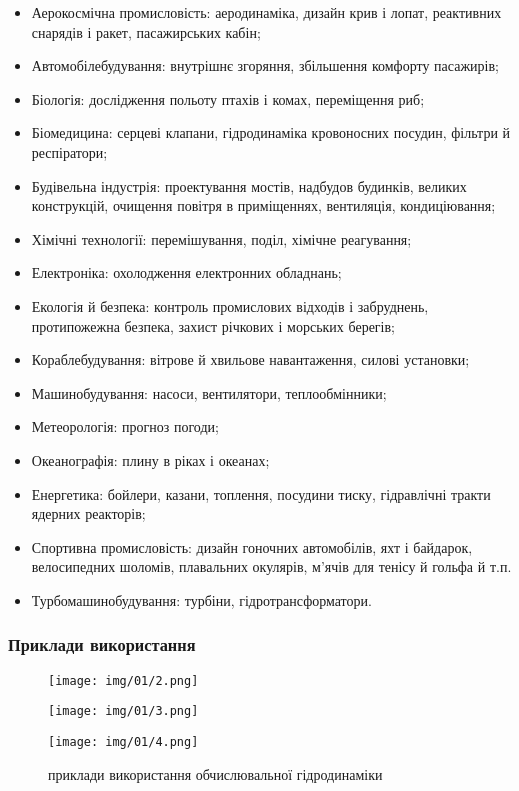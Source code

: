 \begin{itemize}
    \item Аерокосмічна промисловість: аеродинаміка, дизайн крив і лопат, реактивних снарядів і ракет, пасажирських кабін;
    \item Автомобілебудування: внутрішнє згоряння, збільшення комфорту пасажирів;
    \item Біологія: дослідження польоту птахів і комах, переміщення риб;
    \item Біомедицина: серцеві клапани, гідродинаміка кровоносних посудин, фільтри й респіратори;
    \item Будівельна індустрія: проектування мостів, надбудов будинків, великих конструкцій, очищення повітря в приміщеннях, вентиляція, кондиціювання;
    \item Хімічні технології: перемішування, поділ, хімічне реагування;
    \item Електроніка: охолодження електронних обладнань;
    \item Екологія й безпека: контроль промислових відходів і забруднень, протипожежна безпека, захист річкових і морських берегів;
    \item Кораблебудування: вітрове й хвильове навантаження, силові установки;
    \item Машинобудування: насоси, вентилятори, теплообмінники;
    \item Метеорологія: прогноз погоди;
    \item Океанографія: плину в ріках і океанах;
    \item Енергетика: бойлери, казани, топлення, посудини тиску, гідравлічні тракти ядерних реакторів;
    \item Спортивна промисловість: дизайн гоночних автомобілів, яхт і байдарок, велосипедних шоломів, плавальних окулярів, м'ячів для тенісу й гольфа й т.п.
    \item Турбомашинобудування: турбіни, гідротрансформатори.
\end{itemize}

\subsubsection{Приклади використання}
 
\begin{figure}[H]
    \centering
    \texttt{[image: img/01/2.png]}
\end{figure}
\begin{figure}[H]
    \centering
    \texttt{[image: img/01/3.png]}
\end{figure} 
\begin{figure}[H]
    \centering
    \texttt{[image: img/01/4.png]}
    \caption{приклади використання обчислювальної гідродинаміки}
\end{figure} 

